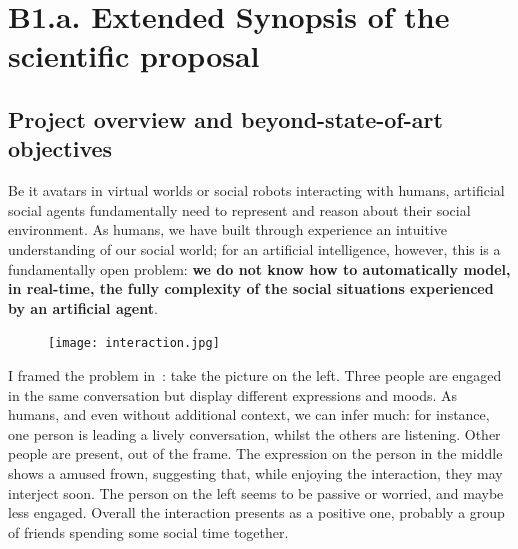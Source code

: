 
\newrefsection


\chapter{B1.a. Extended Synopsis of the scientific proposal}\label{part1}




\section{Project overview and beyond-state-of-art objectives}

Be it avatars in virtual worlds or social robots interacting with humans,
artificial social agents fundamentally need to represent and reason about their
social environment. As humans, we have built through experience an intuitive
understanding of our social world; for an artificial intelligence, however, this
is a fundamentally open problem: \textbf{we do not know how to automatically
model, in real-time, the fully complexity of the social situations experienced
by an artificial agent}.

\begin{figure}
    \centering
    \vspace{-10pt}
    \texttt{[image: interaction.jpg]}
    \label{fig:interaction}
\end{figure}

I framed the problem in~\cite{webb2021framing}: take the picture on the left.
Three people are engaged in the same conversation but display different
expressions and moods.  As humans, and even without additional context, we can
infer much: for instance, one person is leading a lively conversation, whilst
the others are listening.  Other people are present, out of the frame. The
expression on the person in the middle shows a amused frown, suggesting that,
while enjoying the interaction, they may interject soon. The person on the left
seems to be passive or worried, and maybe less engaged.  Overall the interaction
presents as a positive one, probably a group of friends spending some social
time together.

